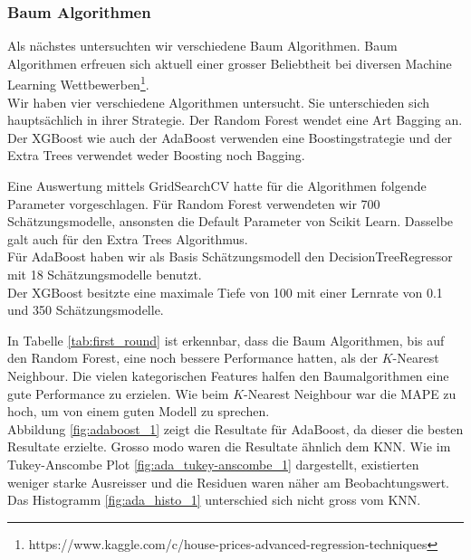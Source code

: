 \subsubsection{Baum Algorithmen}
Als nächstes untersuchten wir verschiedene Baum Algorithmen. Baum Algorithmen erfreuen sich aktuell einer grosser Beliebtheit bei diversen Machine Learning Wettbewerben\footnote{https://www.kaggle.com/c/house-prices-advanced-regression-techniques}.\\[2ex]
%
Wir haben vier verschiedene Algorithmen untersucht. Sie unterschieden sich hauptsächlich in ihrer Strategie. Der Random Forest wendet eine Art Bagging an. Der XGBoost wie auch der AdaBoost verwenden eine Boostingstrategie und der Extra Trees verwendet weder Boosting noch Bagging.

Eine Auswertung mittels GridSearchCV hatte für die Algorithmen folgende Parameter vorgeschlagen.
Für Random Forest verwendeten wir 700 Schätzungsmodelle, ansonsten die Default Parameter von Scikit Learn. Dasselbe galt auch für den Extra Trees Algorithmus.\\
Für AdaBoost haben wir als Basis Schätzungsmodell den DecisionTreeRegressor mit 18 Schätzungsmodelle benutzt.\\
Der XGBoost besitzte eine maximale Tiefe von 100 mit einer Lernrate von 0.1 und 350 Schätzungsmodelle.

\begin{table}[ht]
\centering
{}
\caption{Ergebnisse der Baum Algorithmen}
\label{tab:first_round}
\end{table}

In Tabelle \ref{tab:first_round} ist erkennbar, dass die Baum Algorithmen, bis auf den Random Forest, eine noch bessere Performance hatten, als der $K$-Nearest Neighbour. Die vielen kategorischen Features halfen den Baumalgorithmen eine gute Performance zu erzielen. Wie beim $K$-Nearest Neighbour war die MAPE zu hoch, um von einem guten Modell zu sprechen.\\
Abbildung \ref{fig:adaboost_1} zeigt die Resultate für AdaBoost, da dieser die besten Resultate erzielte. Gros­so mo­do waren die Resultate ähnlich dem KNN. Wie im Tukey-Anscombe Plot \ref{fig:ada_tukey-anscombe_1} dargestellt, existierten weniger starke Ausreisser und die Residuen waren näher am Beobachtungswert. Das Histogramm \ref{fig:ada_histo_1} unterschied sich nicht gross vom KNN.

